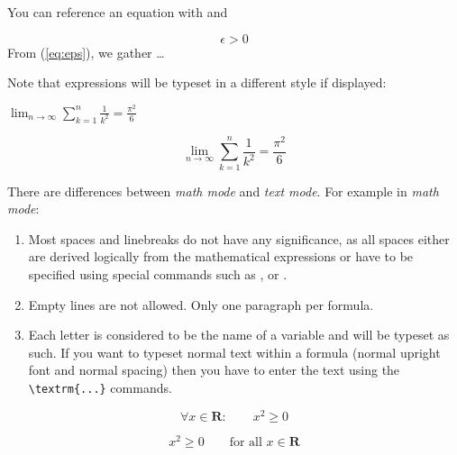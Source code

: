 You can reference an equation with  and 
\begin{example}
\begin{equation} \label{eq:eps}
\epsilon > 0
\end{equation}
From (\ref{eq:eps}), we gather 
\ldots
\end{example}

Note that expressions will be typeset in a different style if displayed:
\begin{example}
$\lim_{n \to \infty} 
\sum_{k=1}^n \frac{1}{k^2} 
= \frac{\pi^2}{6}$
\end{example}
\begin{example}
\begin{displaymath}
\lim_{n \to \infty} 
\sum_{k=1}^n \frac{1}{k^2} 
= \frac{\pi^2}{6}
\end{displaymath}
\end{example}



There are differences between \emph{math mode} and \emph{text mode}. For
example in \emph{math mode}: 

\begin{enumerate}

\item Most spaces and linebreaks do not have any significance, as all spaces
either are derived logically from the mathematical expressions or
have to be specified using special commands such as \ci{,},  or
.
 
\item Empty lines are not allowed. Only one paragraph per formula.

\item Each letter is considered to be the name of a variable and will be
typeset as such. If you want to typeset normal text within a formula
(normal upright font and normal spacing) then you have to enter the
text using the \verb|\textrm{...}| commands.
\end{enumerate}
\begin{example}
\begin{equation}
\forall x \in \mathbf{R}:
\qquad x^{2} \geq 0
\end{equation}
\end{example}
\begin{example}
\begin{equation}
x^{2} \geq 0\qquad
\textrm{for all }x\in\mathbf{R}
\end{equation}
\end{example}
 

